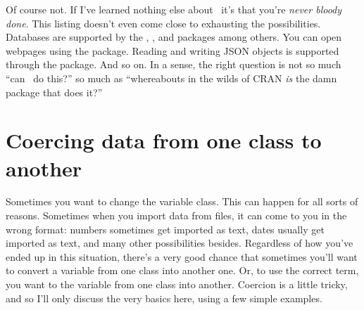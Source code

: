 
Of course not. If I've learned nothing else about \R\ it's that you're {\it never bloody done}. This listing doesn't even come close to exhausting the possibilities. Databases are supported by the , , and  packages among others. You can open webpages using the  package. Reading and writing JSON objects is supported through the  package. And so on. In a sense, the right question is not so much ``can \R\ do this?'' so much as ``whereabouts in the wilds of CRAN {\it is} the damn package that does it?''









\section{Coercing data from one class to another\label{sec:coercion}}

Sometimes you want to change the variable class. This can happen for all sorts of reasons. Sometimes when you import data from files, it can come to you in the wrong format: numbers sometimes get imported as text, dates usually get imported as text, and many other possibilities besides. Regardless of how you've ended up in this situation, there's a very good chance that sometimes you'll want to convert a variable from one class into another one. Or, to use the correct term, you want to  the variable from one class into another. Coercion is a little tricky, and so I'll only discuss the very basics here, using a few simple examples. 

